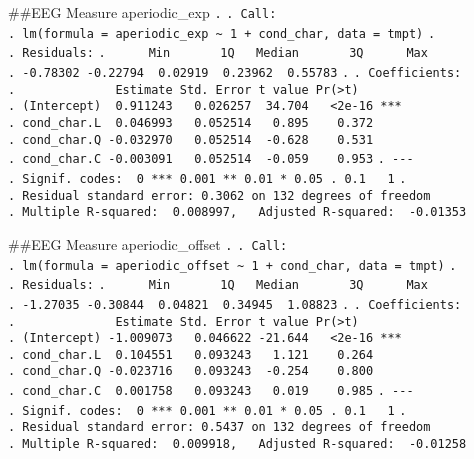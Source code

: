 \documentclass[
]{article}
\begin{document}
\#\#EEG Measure aperiodic\_exp \texttt{.} \texttt{.\ Call:}
\texttt{.\ lm(formula\ =\ aperiodic\_exp\ \textasciitilde{}\ 1\ +\ cond\_char,\ data\ =\ tmpt)}
\texttt{.} \texttt{.\ Residuals:}
\texttt{.\ \ \ \ \ \ Min\ \ \ \ \ \ \ 1Q\ \ \ Median\ \ \ \ \ \ \ 3Q\ \ \ \ \ \ Max}
\texttt{.\ -0.78302\ -0.22794\ \ 0.02919\ \ 0.23962\ \ 0.55783}
\texttt{.} \texttt{.\ Coefficients:}
\texttt{.\ \ \ \ \ \ \ \ \ \ \ \ \ \ Estimate\ Std.\ Error\ t\ value\ Pr(\textgreater{}\textbar{}t\textbar{})}
\texttt{.\ (Intercept)\ \ 0.911243\ \ \ 0.026257\ \ 34.704\ \ \ \textless{}2e-16\ ***}
\texttt{.\ cond\_char.L\ \ 0.046993\ \ \ 0.052514\ \ \ 0.895\ \ \ \ 0.372}
\texttt{.\ cond\_char.Q\ -0.032970\ \ \ 0.052514\ \ -0.628\ \ \ \ 0.531}
\texttt{.\ cond\_char.C\ -0.003091\ \ \ 0.052514\ \ -0.059\ \ \ \ 0.953}
\texttt{.\ -\/-\/-}
\texttt{.\ Signif.\ codes:\ \ 0\ \textquotesingle{}***\textquotesingle{}\ 0.001\ \textquotesingle{}**\textquotesingle{}\ 0.01\ \textquotesingle{}*\textquotesingle{}\ 0.05\ \textquotesingle{}.\textquotesingle{}\ 0.1\ \textquotesingle{}\ \textquotesingle{}\ 1}
\texttt{.}
\texttt{.\ Residual\ standard\ error:\ 0.3062\ on\ 132\ degrees\ of\ freedom}
\texttt{.\ Multiple\ R-squared:\ \ 0.008997,\ \ \ Adjusted\ R-squared:\ \ -0.01353}

\#\#EEG Measure aperiodic\_offset \texttt{.} \texttt{.\ Call:}
\texttt{.\ lm(formula\ =\ aperiodic\_offset\ \textasciitilde{}\ 1\ +\ cond\_char,\ data\ =\ tmpt)}
\texttt{.} \texttt{.\ Residuals:}
\texttt{.\ \ \ \ \ \ Min\ \ \ \ \ \ \ 1Q\ \ \ Median\ \ \ \ \ \ \ 3Q\ \ \ \ \ \ Max}
\texttt{.\ -1.27035\ -0.30844\ \ 0.04821\ \ 0.34945\ \ 1.08823}
\texttt{.} \texttt{.\ Coefficients:}
\texttt{.\ \ \ \ \ \ \ \ \ \ \ \ \ \ Estimate\ Std.\ Error\ t\ value\ Pr(\textgreater{}\textbar{}t\textbar{})}
\texttt{.\ (Intercept)\ -1.009073\ \ \ 0.046622\ -21.644\ \ \ \textless{}2e-16\ ***}
\texttt{.\ cond\_char.L\ \ 0.104551\ \ \ 0.093243\ \ \ 1.121\ \ \ \ 0.264}
\texttt{.\ cond\_char.Q\ -0.023716\ \ \ 0.093243\ \ -0.254\ \ \ \ 0.800}
\texttt{.\ cond\_char.C\ \ 0.001758\ \ \ 0.093243\ \ \ 0.019\ \ \ \ 0.985}
\texttt{.\ -\/-\/-}
\texttt{.\ Signif.\ codes:\ \ 0\ \textquotesingle{}***\textquotesingle{}\ 0.001\ \textquotesingle{}**\textquotesingle{}\ 0.01\ \textquotesingle{}*\textquotesingle{}\ 0.05\ \textquotesingle{}.\textquotesingle{}\ 0.1\ \textquotesingle{}\ \textquotesingle{}\ 1}
\texttt{.}
\texttt{.\ Residual\ standard\ error:\ 0.5437\ on\ 132\ degrees\ of\ freedom}
\texttt{.\ Multiple\ R-squared:\ \ 0.009918,\ \ \ Adjusted\ R-squared:\ \ -0.01258}
\end{document}
